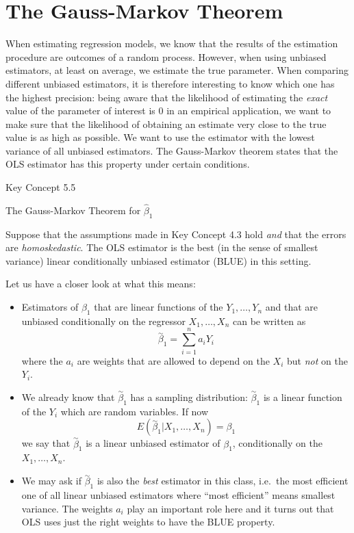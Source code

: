 \documentclass[]{book}
\theoremstyle{definition}
\theoremstyle{definition}
\theoremstyle{definition}
\theoremstyle{remark}
\begin{document}
\section{The Gauss-Markov Theorem}\label{the-gauss-markov-theorem}

When estimating regression models, we know that the results of the
estimation procedure are outcomes of a random process. However, when
using unbiased estimators, at least on average, we estimate the true
parameter. When comparing different unbiased estimators, it is therefore
interesting to know which one has the highest precision: being aware
that the likelihood of estimating the \emph{exact} value of the
parameter of interest is \(0\) in an empirical application, we want to
make sure that the likelihood of obtaining an estimate very close to the
true value is as high as possible. We want to use the estimator with the
lowest variance of all unbiased estimators. The Gauss-Markov theorem
states that the OLS estimator has this property under certain
conditions.

Key Concept 5.5

The Gauss-Markov Theorem for \(\hat{\beta}_1\)

Suppose that the assumptions made in Key Concept 4.3 hold \emph{and}
that the errors are \emph{homoskedastic}. The OLS estimator is the best
(in the sense of smallest variance) linear conditionally unbiased
estimator (BLUE) in this setting.

Let us have a closer look at what this means:

\begin{itemize}
\item
  Estimators of \(\beta_1\) that are linear functions of the
  \(Y_1, \dots, Y_n\) and that are unbiased conditionally on the
  regressor \(X_1, \dots, X_n\) can be written as
  \[ \overset{\sim}{\beta}_1 = \sum_{i=1}^n a_i Y_i \] where the \(a_i\)
  are weights that are allowed to depend on the \(X_i\) but \emph{not}
  on the \(Y_i\).
\item
  We already know that \(\overset{\sim}{\beta}_1\) has a sampling
  distribution: \(\overset{\sim}{\beta}_1\) is a linear function of the
  \(Y_i\) which are random variables. If now
  \[ E(\overset{\sim}{\beta}_1 | X_1, \dots, X_n) = \beta_1 \] we say
  that \(\overset{\sim}{\beta}_1\) is a linear unbiased estimator of
  \(\beta_1\), conditionally on the \(X_1, \dots, X_n\).
\item
  We may ask if \(\overset{\sim}{\beta}_1\) is also the \emph{best}
  estimator in this class, i.e.~the most efficient one of all linear
  unbiased estimators where ``most efficient'' means smallest variance.
  The weights \(a_i\) play an important role here and it turns out that
  OLS uses just the right weights to have the BLUE property.
\end{itemize}
\end{document}
